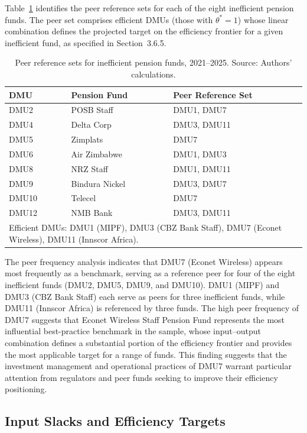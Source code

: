 \documentclass[12pt,a4paper]{article}
\begin{document}
Table~\ref{tab:peers} identifies the peer reference sets for each of the eight inefficient pension funds. The peer set comprises efficient DMUs (those with $\theta^* = 1$) whose linear combination defines the projected target on the efficiency frontier for a given inefficient fund, as specified in Section~3.6.5.

\begin{table}[H]
\centering
\caption{Peer reference sets for inefficient pension funds, 2021--2025. Source: Authors' calculations.}
\label{tab:peers}
\begin{tabular}{lll}
\toprule
\textbf{DMU} & \textbf{Pension Fund} & \textbf{Peer Reference Set} \\
\midrule
DMU2  & POSB Staff       & DMU1, DMU7 \\
DMU4  & Delta Corp       & DMU3, DMU11 \\
DMU5  & Zimplats         & DMU7 \\
DMU6  & Air Zimbabwe     & DMU1, DMU3 \\
DMU8  & NRZ Staff        & DMU1, DMU11 \\
DMU9  & Bindura Nickel   & DMU3, DMU7 \\
DMU10 & Telecel          & DMU7 \\
DMU12 & NMB Bank         & DMU3, DMU11 \\
\bottomrule
\multicolumn{3}{l}{\footnotesize Efficient DMUs: DMU1 (MIPF), DMU3 (CBZ Bank Staff), DMU7 (Econet Wireless), DMU11 (Innscor Africa).}
\end{tabular}
\end{table}

The peer frequency analysis indicates that DMU7 (Econet Wireless) appears most frequently as a benchmark, serving as a reference peer for four of the eight inefficient funds (DMU2, DMU5, DMU9, and DMU10). DMU1 (MIPF) and DMU3 (CBZ Bank Staff) each serve as peers for three inefficient funds, while DMU11 (Innscor Africa) is referenced by three funds. The high peer frequency of DMU7 suggests that Econet Wireless Staff Pension Fund represents the most influential best-practice benchmark in the sample, whose input--output combination defines a substantial portion of the efficiency frontier and provides the most applicable target for a range of funds. This finding suggests that the investment management and operational practices of DMU7 warrant particular attention from regulators and peer funds seeking to improve their efficiency positioning.

\subsection{Input Slacks and Efficiency Targets}
\end{document}
